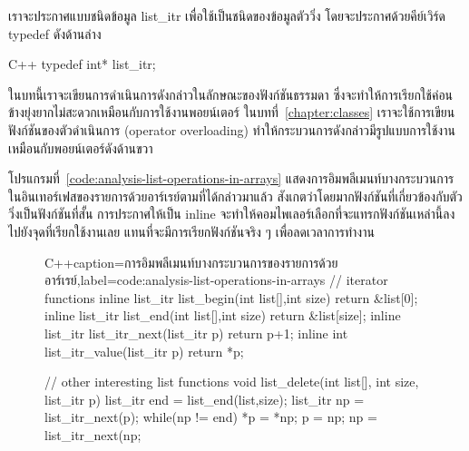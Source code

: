 เรา{\wbr}จะ{\wbr}ประกาศ{\wbr}แบบ{\wbr}ชนิด{\wbr}ข้อมูล {\ct list\_itr} เพื่อ{\wbr}ใช้{\wbr}เป็น{\wbr}ชนิด{\wbr}ของ{\wbr}ข้อมูล{\wbr}ตัว{\wbr}วิ่ง{\wbr}
โดย{\wbr}จะ{\wbr}ประกาศ{\wbr}ด้วย{\wbr}คีย์{\wbr}เวิร์ด {\ct typedef} ดัง{\wbr}ด้าน{\wbr}ล่าง{\wbr}

\latintext
\begin{codelist}{C++}{}
typedef int* list_itr;
\end{codelist}
\thaitext

ใน{\wbr}บท{\wbr}นี้{\wbr}เรา{\wbr}จะ{\wbr}เขียน{\wbr}การ{\wbr}ดำเนินการ{\wbr}ดังกล่าว{\wbr}ใน{\wbr}ลักษณะ{\wbr}ของ{\wbr}ฟังก์ชัน{\wbr}ธรรมดา{\wbr}
ซึ่ง{\wbr}จะ{\wbr}ทำ{\wbr}ให้การ{\wbr}เรียก{\wbr}ใช้{\wbr}ค่อนข้าง{\wbr}ยุ่งยาก{\wbr}ไม่{\wbr}สะดวก{\wbr}เหมือน{\wbr}กับ{\wbr}การ{\wbr}ใช้{\wbr}งาน{\wbr}พอยน์เตอร์
ใน{\wbr}บท{\wbr}ที่~\ref{chapter:classes} เรา{\wbr}จะ{\wbr}ใช้{\wbr}การ{\wbr}เขียน{\wbr}ฟังก์ชัน{\wbr}ของ{\wbr}ตัวดำเนินการ (operator
overloading) ทำ{\wbr}ให้{\wbr}กระบวนการ{\wbr}ดังกล่าว{\wbr}มี{\wbr}รูปแบบ{\wbr}การ{\wbr}ใช้{\wbr}งาน{\wbr}เหมือน{\wbr}กับ{\wbr}พอยน์เตอร์{\wbr}ดัง{\wbr}ด้าน{\wbr}ขวา{\wbr}

โปรแกรม{\wbr}ที่~\ref{code:analysis-list-operations-in-arrays}
แสดง{\wbr}การ{\wbr}อิม{\wbr}พลี{\wbr}เมนท์{\wbr}บาง{\wbr}กระบวนการ{\wbr}ใน{\wbr}อิน{\wbr}เทอร์เฟส{\wbr}ของ{\wbr}รายการ{\wbr}ด้วย{\wbr}อาร์เรย์{\wbr}ตาม{\wbr}ที่{\wbr}ได้{\wbr}กล่าว{\wbr}มา{\wbr}แล้ว{\wbr}
สังเกต{\wbr}ว่า{\wbr}โดยมาก{\wbr}ฟังก์ชัน{\wbr}ที่{\wbr}เกี่ยวข้อง{\wbr}กับ{\wbr}ตัว{\wbr}วิ่ง{\wbr}เป็น{\wbr}ฟังก์ชัน{\wbr}ที่{\wbr}สั้น การ{\wbr}ประกาศ{\wbr}ให้{\wbr}เป็น {\ct
  inline} จะ{\wbr}ทำ{\wbr}ให้{\wbr}คอม{\wbr}ไพ{\wbr}เลอร์{\wbr}เลือก{\wbr}ที่{\wbr}จะ{\wbr}แทรก{\wbr}ฟังก์ชัน{\wbr}เหล่านี้{\wbr}ลง{\wbr}ไป{\wbr}ยัง{\wbr}จุด{\wbr}ที่{\wbr}เรียก{\wbr}ใช้{\wbr}งาน{\wbr}เลย{\wbr}
แทน{\wbr}ที่{\wbr}จะ{\wbr}มี{\wbr}การ{\wbr}เรียก{\wbr}ฟังก์ชัน{\wbr}จริง ๆ เพื่อ{\wbr}ลด{\wbr}เวลา{\wbr}การ{\wbr}ทำงาน{\wbr}

\begin{figure}
\latintext
\begin{codelist}{C++}{caption={\thaitext การ{\wbr}อิม{\wbr}พลี{\wbr}เมนท์{\wbr}บาง{\wbr}กระบวนการ{\wbr}ของ{\wbr}รายการ{\wbr}ด้วย{\wbr}อาร์เรย์\latintext},label=code:analysis-list-operations-in-arrays}
// iterator functions
inline list_itr list_begin(int list[],int size) {return &list[0];}
inline list_itr list_end(int list[],int size) {return &list[size];}
inline list_itr list_itr_next(list_itr p) { return p+1; }
inline int list_itr_value(list_itr p) { return *p; }

// other interesting list functions
void list_delete(int list[], int size, list_itr p)
{
  list_itr end = list_end(list,size);
  list_itr np = list_itr_next(p);
  while(np != end) {
    *p = *np;
    p = np;
    np = list_itr_next(np;
  }
}
\end{codelist}
\thaitext
\end{figure}

